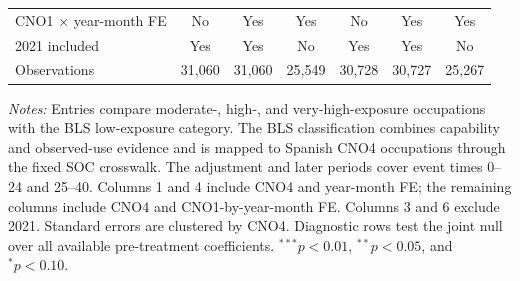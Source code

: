 \begin{table}[H]
\begin{threeparttable}
\begin{tabular}{lcccccc}
\addlinespace[4pt]
\midrule
CNO1 $\times$ year-month FE & No & Yes & Yes & No & Yes & Yes \\
2021 included & Yes & Yes & No & Yes & Yes & No \\
Observations & 31,060 & 31,060 & 25,549 & 30,728 & 30,727 & 25,267 \\
\bottomrule
\end{tabular}
\begin{tablenotes}[flushleft]
\footnotesize
\item \emph{Notes:} Entries compare moderate-, high-, and very-high-exposure occupations with the BLS low-exposure category. The BLS classification combines capability and observed-use evidence and is mapped to Spanish CNO4 occupations through the fixed SOC crosswalk. The adjustment and later periods cover event times 0--24 and 25--40. Columns 1 and 4 include CNO4 and year-month FE; the remaining columns include CNO4 and CNO1-by-year-month FE. Columns 3 and 6 exclude 2021. Standard errors are clustered by CNO4. Diagnostic rows test the joint null over all available pre-treatment coefficients. $^{***}p<0.01$, $^{**}p<0.05$, and $^{*}p<0.10$.
\end{tablenotes}
\end{threeparttable}
\end{table}
